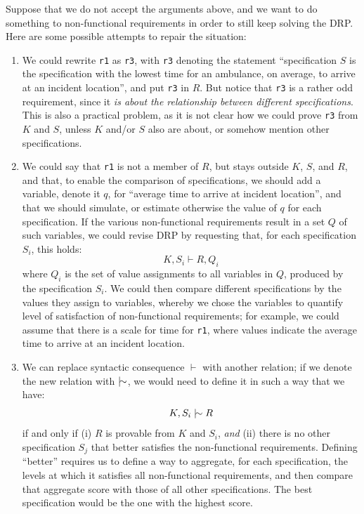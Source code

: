 \documentclass[graybox]{svmult}
\newcommand{\zi}[1]{\textit{#1}}
\newcommand{\xt}[1]{\texttt{#1}}
\newcommand{\req}[1]{\xt{#1}}
\newcommand{\ZJRP}{DRP}
\newcommand{\nmdash}{\mid\negthinspace\sim}
\begin{document}
Suppose that we do not accept the arguments above, and we want to do something to non-functional requirements in order to still keep solving the \ZJRP. Here are some possible attempts to repair the situation:
\begin{enumerate}
    \item{We could rewrite \req{r1} as \req{r3}, with \req{r3} denoting the statement ``specification $S$ is the specification with the lowest time for an ambulance, on average, to arrive at an incident location'', and put \req{r3} in $R$. But notice that \req{r3} is a rather odd requirement, since it \zi{is about the relationship between different specifications}. This is also a practical problem, as it is not clear how we could prove \req{r3} from $K$ and $S$, unless $K$ and/or $S$ also are about, or somehow mention other specifications.}
    \item{We could say that \req{r1} is not a member of $R$, but stays outside $K$, $S$, and $R$, and that, to enable the comparison of specifications, we should add a variable, denote it $q$, for ``average time to arrive at incident location'', and that we should simulate, or estimate otherwise the value of $q$ for each specification. If the various non-functional requirements result in a set $Q$ of such variables, we could revise \ZJRP{} by requesting that, for each specification $S_{i}$, this holds: 
    \begin{equation}
        K, S_{i} \vdash R, Q_{i} 
    \end{equation}
    where $Q_{i}$ is the set of value assignments to all variables in $Q$, produced by the specification $S_{i}$. We could then compare different specifications by the values they assign to variables, whereby we chose the variables to quantify level of satisfaction of non-functional requirements; for example, we could assume that there is a scale for time for \req{r1}, where values indicate the average time to arrive at an incident location.}
    \item{We can replace syntactic consequence $\vdash$ with another relation; if we denote the new relation with $\nmdash$, we would need to define it in such a way that we have:
    \begin{equation}
        K, S_{i} \nmdash R
    \end{equation}
    if and only if (i) $R$ is provable from $K$ and $S_{i}$, \zi{and} (ii) there is no other specification $S_{j}$ that better satisfies the non-functional requirements. Defining ``better'' requires us to define a way to aggregate, for each specification, the levels at which it satisfies all non-functional requirements, and then compare that aggregate score with those of all other specifications. The best specification would be the one with the highest score.}
\end{enumerate}
\end{document}
